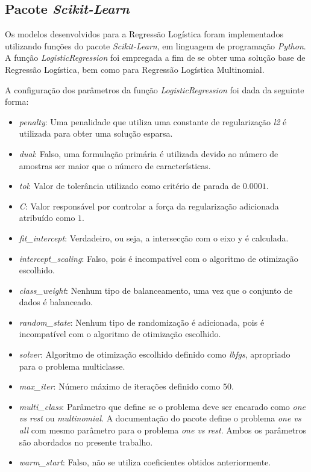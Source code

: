 \documentclass[conference]{IEEEtran}
\begin{document}
\subsection{Pacote \textit{Scikit-Learn}} \label{sec:pac}

Os modelos desenvolvidos para a Regressão Logística foram implementados utilizando funções do pacote \emph{Scikit-Learn}, em linguagem de programação \emph{Python}. A função \emph{LogisticRegression} foi empregada a fim de se obter uma solução base de Regressão Logística, bem como para Regressão Logística Multinomial.

A configuração dos parâmetros da função \emph{LogisticRegression} foi dada da seguinte forma:
\begin{itemize}
	\small \item \textit{penalty}: Uma penalidade que utiliza uma constante de regularização \small \textit{l2} é utilizada para obter uma solução esparsa.
	\small \item \textit{dual}: Falso, uma formulação primária é utilizada devido ao número de amostras ser maior que o número de características.
	\small \item \textit{tol}: Valor de tolerância utilizado como critério de parada de $0.0001$.
	\small \item \textit{C}: Valor responsável por controlar a força da regularização adicionada atribuído como $1$.
	\small \item \textit{fit\_intercept}: Verdadeiro, ou seja, a intersecção com o eixo y é calculada.
	\small \item \textit{intercept\_scaling}: Falso, pois é incompatível com o algoritmo de otimização escolhido.
	\small \item \textit{class\_weight}: Nenhum tipo de balanceamento, uma vez que o conjunto de dados é balanceado.
	\small \item \textit{random\_state}: Nenhum tipo de randomização é adicionada, pois é incompatível com o algoritmo de otimização escolhido.
	\small \item \textit{solver}: Algoritmo de otimização escolhido definido como \textit{lbfgs}, apropriado para o problema multiclasse.
	\small \item \textit{max\_iter}: Número máximo de iterações definido como $50$.
	\small \item \textit{multi\_class}: Parâmetro que define se o problema deve ser encarado como \textit{one vs rest} ou \textit{multinomial}. A documentação do pacote define o problema \textit{one vs all} com mesmo parâmetro para o problema \textit{one vs rest}. Ambos os parâmetros são abordados no presente trabalho. 
	\small \item \textit{warm\_start}: Falso, não se utiliza coeficientes obtidos anteriormente.
\end{itemize}
\end{document}

